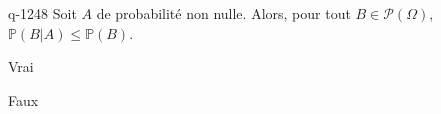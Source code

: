 \begin{truefalse}{q-1248}
Soit $A$ de probabilité non nulle. Alors, pour tout $B\in \mathscr P(\Omega)$, $\mathbb{P}(B|A)\leq \mathbb{P}(B)$.
\item Vrai
\item* Faux
\end{truefalse}

